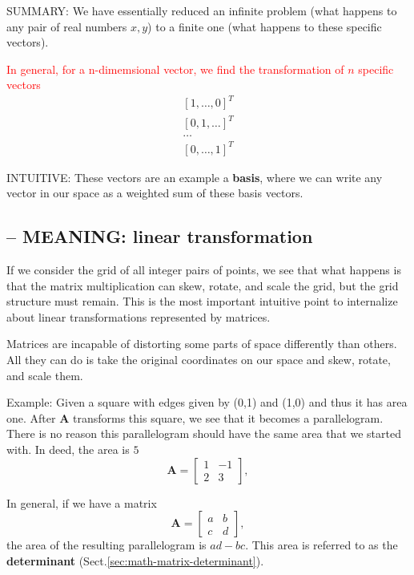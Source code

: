 SUMMARY: We have essentially reduced an infinite problem (what happens to any
pair of real numbers $x, y$) to a finite one (what happens to these specific
vectors).

\textcolor{red}{In general, for a n-dimemsional vector, we find the transformation of $n$ specific vectors}
\begin{equation}
\begin{split}
[1, \ldots, 0]^T \\
[0, 1, \ldots]^T \\
\ldots \\
[0, \ldots, 1]^T 
\end{split}
\end{equation}

INTUITIVE: These vectors are an example a {\bf basis}, where we can write any
vector in our space as a weighted sum of these basis vectors.

\subsection{-- MEANING: linear transformation}
\label{sec:math-linear-transformation}

If we consider the grid of all integer pairs of points, we see that what happens
is that the matrix multiplication can skew, rotate, and scale the grid, but the
grid structure must remain. This is the most important intuitive point to
internalize about linear transformations represented by matrices.

Matrices are incapable of distorting some parts of space differently than
others. All they can do is take the original coordinates on our space and skew,
rotate, and scale them.

Example: Given  a square with edges given by (0,1) and (1,0) and thus it has
area one. After $\mathbf{A}$ transforms this square, we see that it becomes a
parallelogram. There is no reason this parallelogram should have the same area that we started
with. In deed, the area is $5$
\begin{equation}
\mathbf{A} = \begin{bmatrix}
1 & -1 \\
2 & 3
\end{bmatrix},
\end{equation}

In general, if we have a matrix
\begin{equation}
\mathbf{A} = \begin{bmatrix}
a & b \\
c & d
\end{bmatrix},
\end{equation}
the area  of the resulting parallelogram is $ad-bc$.
This area is referred to as the {\bf determinant} (Sect.\ref{sec:math-matrix-determinant}).

